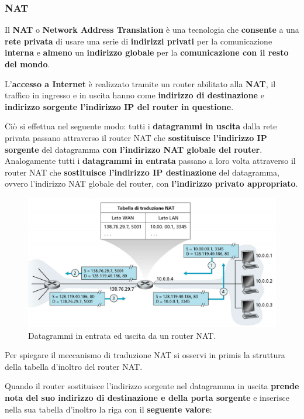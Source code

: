 \documentclass[11pt,a4paper,oneside]{book}
\theoremstyle{definition}
\begin{document}
\pagebreak

\subsubsection{NAT}
Il \textbf{NAT} o \textbf{Network Address Translation} è una tecnologia che \textbf{consente} a una \textbf{rete privata} di usare una serie di \textbf{indirizzi privati} per la comunicazione \textbf{interna} e \textbf{almeno} un \textbf{indirizzo globale} per la \textbf{comunicazione con il resto del mondo}.

L'\textbf{accesso a Internet} è realizzato tramite un router abilitato alla \textbf{NAT}, il traffico in ingresso e in uscita hanno come \textbf{indirizzo di destinazione} e \textbf{indirizzo sorgente l'indirizzo IP del router in questione}.

Ciò si effettua nel seguente modo: tutti i \textbf{datagrammi in uscita} dalla rete privata passano attraverso il router NAT che \textbf{sostituisce l'indirizzo IP sorgente} del datagramma \textbf{con l'indirizzo NAT globale del router}. Analogamente tutti i \textbf{datagrammi in entrata} passano a loro volta attraverso il router NAT che \textbf{sostituisce l'indirizzo IP destinazione} del datagramma, ovvero l'indirizzo NAT globale del router, con \textbf{l'indirizzo privato appropriato}.

\begin{figure}[!h]
	\includegraphics[scale=0.35]{Immagini/Ip_nat.png}
	\centering
	\caption{Datagrammi in entrata ed uscita da un router NAT.}
\end{figure}

Per spiegare il meccanismo di traduzione NAT si osservi in primis la struttura della tabella d'inoltro del router NAT.

Quando il router sostituisce l'indirizzo sorgente nel datagramma in uscita \textbf{prende nota del suo indirizzo di destinazione e della porta sorgente} e inserisce nella sua tabella d'inoltro la riga con il \textbf{seguente valore}:
\end{document}
